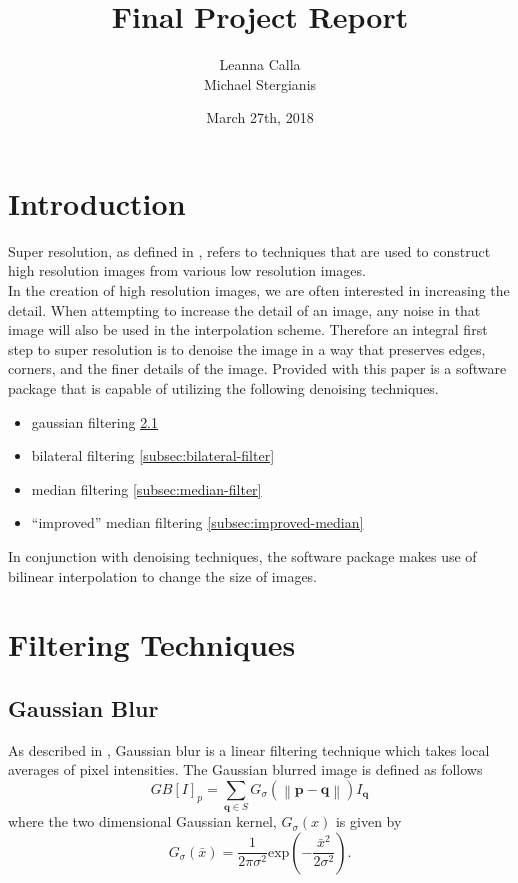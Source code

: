 \documentclass{article}
\title{Final Project Report}
\author{Leanna Calla \\ Michael Stergianis}
\date{March 27th, 2018}
\newcommand{\norm}[1]{\left\| #1 \right\|}
\begin{document}
\maketitle
%
%
\section{Introduction}
\label{sec:introduction}
Super resolution, as defined in \cite{Yang}, refers to techniques that
are used to construct high resolution images from various low
resolution images. \\

In the creation of high resolution images, we are often interested in
increasing the detail. When attempting to increase the detail of an image, any noise in
that image will also be used in the interpolation scheme. Therefore
an integral first step to super resolution is to denoise the image
in a way that preserves edges, corners, and the finer details of the
image.
%
Provided with this paper is a software package that is capable of
utilizing the following denoising techniques.
\begin{itemize}
  \item gaussian filtering \ref{subsec:gauss-blur}
  \item bilateral filtering \ref{subsec:bilateral-filter}
  \item median filtering \ref{subsec:median-filter}
  \item ``improved'' median filtering \ref{subsec:improved-median}
\end{itemize}
%
In conjunction with denoising techniques, the software package makes
use of bilinear interpolation to change the size of images.
%
\section{Filtering Techniques}
\label{sec:filter-tech}
\subsection{Gaussian Blur}
\label{subsec:gauss-blur}
As described in \cite{bilateral}, Gaussian blur is a linear filtering
technique which takes local averages of pixel intensities. The
Gaussian blurred image is defined as follows
\[GB[I]_p = \displaystyle \sum_{\textbf{q} \in S}G_{\sigma} \left(
    \norm{\textbf{p} - \textbf{q}}\right)I_{\textbf{q}} \]
where the two dimensional Gaussian kernel, $G_{\sigma}(x)$ is given by
\[G_{\sigma}(\bar{x}) = \frac{1}{2 \pi \sigma^2} \text{exp} \left(-
    \frac{\bar{x}^2}{2 \sigma^2}\right). \]
%
\end{document}
